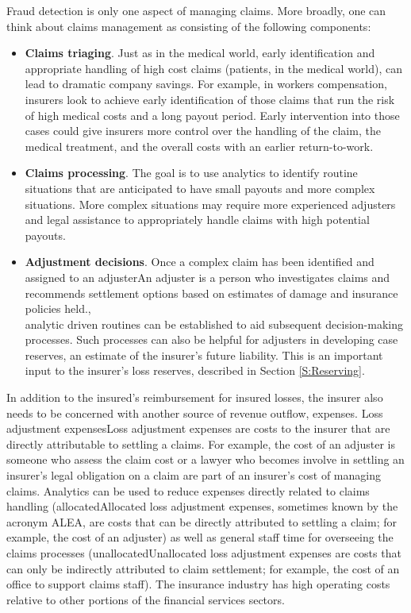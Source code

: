 \documentclass[]{book}
\theoremstyle{definition}
\theoremstyle{definition}
\theoremstyle{definition}
\theoremstyle{remark}
\begin{document}
Fraud detection is only one aspect of managing claims. More broadly, one
can think about claims management as consisting of the following
components:

\begin{itemize}
\item
  \textbf{Claims triaging}. Just as in the medical world, early
  identification and appropriate handling of high cost claims (patients,
  in the medical world), can lead to dramatic company savings. For
  example, in workers compensation, insurers look to achieve early
  identification of those claims that run the risk of high medical costs
  and a long payout period. Early intervention into those cases could
  give insurers more control over the handling of the claim, the medical
  treatment, and the overall costs with an earlier return-to-work.
\item
  \textbf{Claims processing}. The goal is to use analytics to identify
  routine situations that are anticipated to have small payouts and more
  complex situations. More complex situations may require more
  experienced adjusters and legal assistance to appropriately handle
  claims with high potential payouts.
\item
  \textbf{Adjustment decisions}. Once a complex claim has been
  identified and assigned to an adjuster{An adjuster is a person who
  investigates claims and recommends settlement options based on
  estimates of damage and insurance policies held.},\\
  analytic driven routines can be established to aid subsequent
  decision-making\\
  processes. Such processes can also be helpful for adjusters in
  developing case reserves, an estimate of the insurer's future
  liability. This is an important input to the insurer's loss reserves,
  described in Section \ref{S:Reserving}.
\end{itemize}

In addition to the insured's reimbursement for insured losses, the
insurer also needs to be concerned with another source of revenue
outflow, expenses. Loss adjustment expenses{Loss adjustment expenses are
costs to the insurer that are directly attributable to settling a
claims. For example, the cost of an adjuster is someone who assess the
claim cost or a lawyer who becomes involve in settling an insurer's
legal obligation on a claim} are part of an insurer's cost of managing
claims. Analytics can be used to reduce expenses directly related to
claims handling (allocated{Allocated loss adjustment expenses, sometimes
known by the acronym ALEA, are costs that can be directly attributed to
settling a claim; for example, the cost of an adjuster}) as well as
general staff time for overseeing the claims processes
(unallocated{Unallocated loss adjustment expenses are costs that can
only be indirectly attributed to claim settlement; for example, the cost
of an office to support claims staff}). The insurance industry has high
operating costs relative to other portions of the financial services
sectors.
\end{document}

